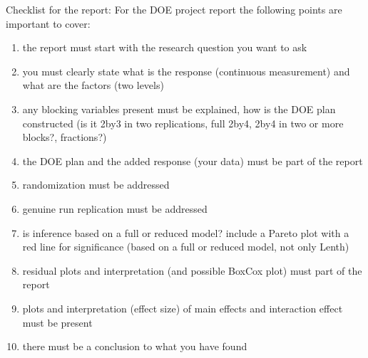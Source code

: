 Checklist for the report: For the DOE project report the following points are important to cover:

\begin{enumerate}
    \item the report must start with the research question you want to ask
    \item you must clearly state what is the response (continuous measurement) and what are the factors (two levels)
    \item any blocking variables present must be explained,
how is the DOE plan constructed (is it 2by3 in two replications, full 2by4, 2by4 in two or more blocks?, fractions?)
    \item the DOE plan and the added response (your data) must be part of the report
    \item randomization must be addressed
    \item genuine run replication must be addressed
    \item is inference based on a full or reduced model? include a Pareto plot with a red line for significance (based on a full or reduced model, not only Lenth)
    \item residual plots and interpretation (and possible BoxCox plot) must part of the report
    \item plots and interpretation (effect size) of main effects and interaction effect must be present
    \item there must be a conclusion to what you have found
\end{enumerate}